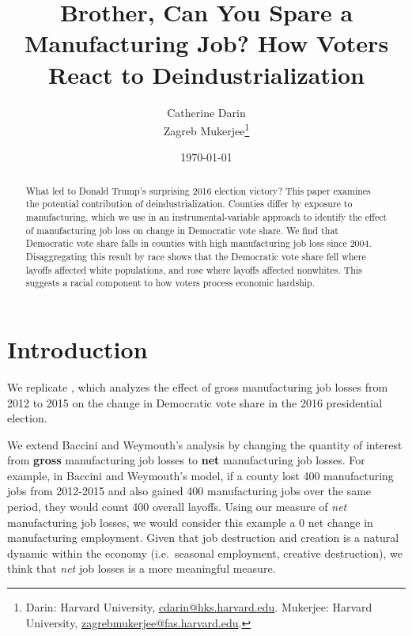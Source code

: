 \documentclass[]{AEA}
\begin{document}
\title{Brother, Can You Spare a Manufacturing Job? How Voters React to
Deindustrialization}



\author{
  Catherine Darin\\
  Zagreb Mukerjee\thanks{
  Darin: Harvard
University, \href{mailto:cdarin@hks.harvard.edu}{cdarin@hks.harvard.edu}.
  Mukerjee: Harvard
University, \href{mailto:zagrebmukerjee@fas.harvard.edu}{zagrebmukerjee@fas.harvard.edu}.
}
}

\date{\today}
\JEL{}
\Keywords{}

\begin{abstract}
What led to Donald Trump's surprising 2016 election victory? This paper
examines the potential contribution of deindustrialization. Counties
differ by exposure to manufacturing, which we use in an
instrumental-variable approach to identify the effect of manufacturing
job loss on change in Democratic vote share. We find that Democratic
vote share falls in counties with high manufacturing job loss since
2004. Disaggregating this result by race shows that the Democratic vote
share fell where layoffs affected white populations, and rose where
layoffs affected nonwhites. This suggests a racial component to how
voters process economic hardship.
\end{abstract}


\maketitle

\section{Introduction}

We replicate \cite{BW21}, which analyzes the effect of gross
manufacturing job losses from 2012 to 2015 on the change in Democratic
vote share in the 2016 presidential election.

We extend Baccini and Weymouth's analysis by changing the quantity of
interest from \textbf{gross} manufacturing job losses to \textbf{net}
manufacturing job losses. For example, in Baccini and Weymouth's model,
if a county lost 400 manufacturing jobs from 2012-2015 and also gained
400 manufacturing jobs over the same period, they would count 400
overall layoffs. Using our measure of \emph{net} manufacturing job
losses, we would consider this example a 0 net change in manufacturing
employment. Given that job destruction and creation is a natural dynamic
within the economy (i.e.~seasonal employment, creative destruction), we
think that \emph{net} job losses is a more meaningful measure.
\end{document}

